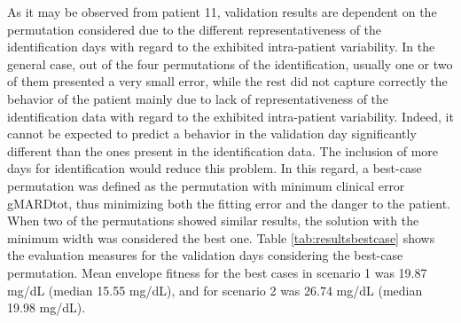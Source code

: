 As it may be observed from patient 11, validation results are dependent on the permutation considered due to the different representativeness of the identification days with regard to the exhibited intra-patient variability. In the general case, out of the four permutations of the identification, usually one or two of them presented a very small error, while the rest did not capture correctly the behavior of the patient mainly due to lack of representativeness of the identification data with regard to the exhibited intra-patient variability. Indeed, it cannot be expected to predict a behavior in the validation day significantly different than the ones present in the identification data. The inclusion of more days for identification would reduce this problem. In this regard, a best-case permutation was defined as the permutation with minimum clinical error gMARDtot, thus minimizing both the fitting error and the danger to the patient. When two of the permutations showed similar results, the solution with the minimum width was considered the best one. Table \ref{tab:resultsbestcase} shows the evaluation measures for the validation days considering the best-case permutation. Mean envelope fitness for the best cases in scenario 1 was 19.87 mg/dL (median 15.55 mg/dL), and for scenario 2 was 26.74 mg/dL (median 19.98 mg/dL).

